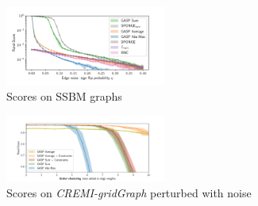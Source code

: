 
\begin{figure}[t]
\centering
\includegraphics[width=0.47\textwidth,trim=0.25in 0.in 0.5in 0.in,clip]{./figs/SSBM_experiments.pdf}
        \caption{Scores on SSBM graphs}
\end{figure}
\begin{figure}[t]
\centering
\includegraphics[width=0.47\textwidth,trim=0.53in 0.1in 0.65in 0.45in,clip]{./figs/noise_plots/under_segment_plots_1.pdf}
        \caption{Scores on \emph{CREMI-gridGraph} perturbed with noise}
\end{figure}


